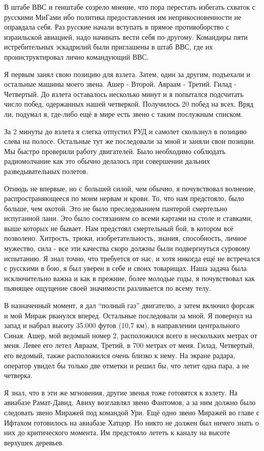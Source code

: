 \begin{textcitation}
	В штабе ВВС и генштабе созрело мнение, что пора перестать избегать схваток с русскими МиГами ибо политика предоставления им неприкосновенности не оправдала себя. Раз русские начали вступать в прямое противоборство с израильской авиацией, надо начинать вести себя по-другому. Командиры пяти истребительных эскадрилий были приглашены в штаб ВВС, где их проинструктировал лично командующий ВВС.
	
	Я первым занял свою позицию для взлета. Затем, один за другим, подъехали и остальные машины моего звена. Ашер - Второй. Авраам - Третий. Гилад - Четвертый. До взлета оставалось несколько минут и я попытался подсчитать число побед, одержанных нашей четверкой. Получилось 20 побед на всех. Вряд ли, подумал я, где-либо ещё в мире есть звено с таким послужным списком.
	
	За 2 минуты до взлета я слегка отпустил РУД и самолет скользнул в позицию слева на полосе. Остальные тут же последовали за мной и заняли свои позиции. Мы быстро проверили работу двигателей. Было необходимо соблюдать радиомолчание как это обычно делалось при совершении дальних разведывательных полетов.
	
	Отнюдь не впервые, но с большей силой, чем обычно, я почувствовал волнение, распространяющееся по моим нервам и крови. То, что нам предстояло, было больше, чем охотой. Это не было преследованием пантерой смертельно испуганной лани. Это было состязанием со всеми картами на столе и ставками, выше которых не бывает. Нам предстоял смертельный бой, в котором всё позволено. Хитрость, трюки, изобретательность, знания, способность, личное мужество, сила - все эти качества скоро должны были подвергнуться суровому испытанию. Я знал точно, что требуется от нас, и хотя никогда ещё не встречался с русскими в бою, я был уверен в себе и своих товарищах. Наша задача была исключительно важна и как в прежние, более молодые годы, я почувствовал как пьянящее ощущение своей значимости разливается по всему телу.
	
	В назначенный момент, я дал “полный газ” двигателю, а затем включил форсаж и мой Мираж рванулся вперед. Остальные последовали за мной. Я повернул на запад и набрал высоту 35.000 футов (10,7 км), в направлении центрального Синая. Ашер, мой ведомый номер 2, расположился всего в нескольких метрах от меня. Левее его летел Авраам, Третий, в 700 метрах от меня. Гилад, Четвертый, его ведомый, также расположился очень близко к нему. На экране радара, оператор увидел бы только две отметки и решил бы, что летит одна пара, а не четверка.
	
	Я знал, что в эти же мгновения, другие звенья тоже готовятся к взлету. На авиабазе Рамат-Давид, Авиху возглавлял звено Фантомов, а за ним должно было следовать звено Миражей под командой Ури. Ещё одно звено Миражей во главе с Ифтахом готовилось на авиабазе Хатцор. Но никто не должен был ничего знать о них до критического момента. Им предстояло лететь к каналу на высоте верхушек деревьев.
\end{textcitation}

